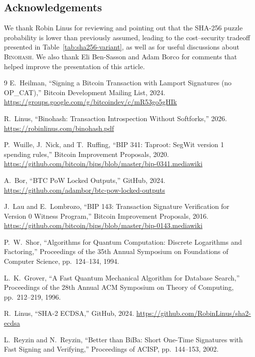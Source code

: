 \documentclass[11pt, a4paper]{article}
\begin{document}
\subsection*{Acknowledgements}

We thank Robin Linus for reviewing and pointing out that the SHA-256 puzzle probability is lower than previously assumed, leading to the cost--security tradeoff presented in Table~\ref{tab:sha256-variant}, as well as for useful discussions about \textsc{Binohash}. We also thank Eli Ben-Sasson and Adam Borco for comments that helped improve the presentation of this article.

\begin{thebibliography}{9}
    E.~Heilman,
    ``Signing a Bitcoin Transaction with Lamport Signatures (no OP\_CAT),''
    Bitcoin Development Mailing List, 2024.
    \url{https://groups.google.com/g/bitcoindev/c/mR53go5gHIk}

    R.~Linus,
    ``Binohash: Transaction Introspection Without Softforks,''
    2026.
    \url{https://robinlinus.com/binohash.pdf}

    P.~Wuille, J.~Nick, and T.~Ruffing,
    ``BIP 341: Taproot: SegWit version 1 spending rules,''
    Bitcoin Improvement Proposals, 2020.
    \url{https://github.com/bitcoin/bips/blob/master/bip-0341.mediawiki}

    A.~Bor,
    ``BTC PoW Locked Outputs,''
    GitHub, 2024.
    \url{https://github.com/adambor/btc-pow-locked-outputs}

    J.~Lau and E.~Lombrozo,
    ``BIP 143: Transaction Signature Verification for Version 0 Witness Program,''
    Bitcoin Improvement Proposals, 2016.
    \url{https://github.com/bitcoin/bips/blob/master/bip-0143.mediawiki}

    P.~W.~Shor,
    ``Algorithms for Quantum Computation: Discrete Logarithms and Factoring,''
    Proceedings of the 35th Annual Symposium on Foundations of Computer Science, pp.~124--134, 1994.

    L.~K.~Grover,
    ``A Fast Quantum Mechanical Algorithm for Database Search,''
    Proceedings of the 28th Annual ACM Symposium on Theory of Computing, pp.~212--219, 1996.

    R.~Linus,
    ``SHA-2 ECDSA,''
    GitHub, 2024.
    \url{https://github.com/RobinLinus/sha2-ecdsa}

    L.~Reyzin and N.~Reyzin,
    ``Better than BiBa: Short One-Time Signatures with Fast Signing and Verifying,''
    Proceedings of ACISP, pp.~144--153, 2002.
\end{thebibliography}
\end{document}
